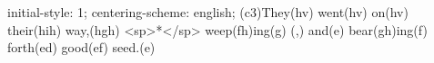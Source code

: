 initial-style: 1;
centering-scheme: english;
(c3)They(hv) went(hv) on(hv) their(hih) way,(hgh) <sp>*</sp> weep(fh)ing(g) (,) and(e) bear(gh)ing(f) forth(ed) good(ef) seed.(e)
